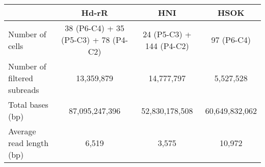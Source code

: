 \begin{tabular}{lccc}
  \hline
  & Hd-rR & HNI & HSOK \\ \hline
  Number of cells & 38 (P6-C4) + 35 (P5-C3) + 78 (P4-C2) & 24 (P5-C3) + 144 (P4-C2)	& 97 (P6-C4) \\
  Number of filtered subreads & 13,359,879	& 14,777,797 & 5,527,528 \\
  Total bases (bp) & 87,095,247,396 & 52,830,178,508 & 60,649,832,062 \\
  Average read length (bp) & 6,519 & 3,575 & 10,972 \\
  \hline
\end{tabular}

